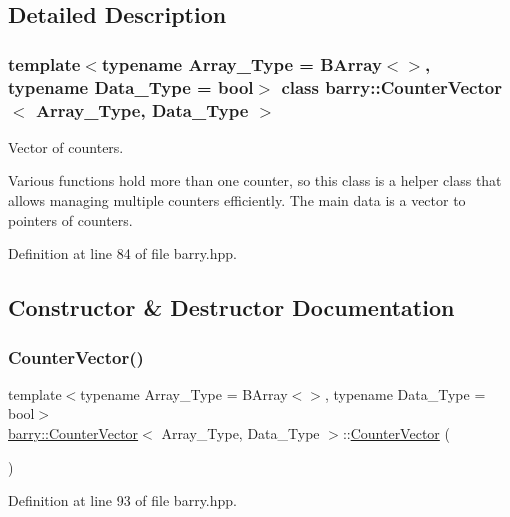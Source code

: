 \subsection{Detailed Description}
\subsubsection*{template$<$typename Array\+\_\+\+Type = B\+Array$<$$>$, typename Data\+\_\+\+Type = bool$>$\newline
class barry\+::\+Counter\+Vector$<$ Array\+\_\+\+Type, Data\+\_\+\+Type $>$}

Vector of counters. 

Various functions hold more than one counter, so this class is a helper class that allows managing multiple counters efficiently. The main data is a vector to pointers of counters. 

Definition at line 84 of file barry.\+hpp.



\subsection{Constructor \& Destructor Documentation}
\mbox{\label{classbarry_1_1_counter_vector_a620e7a96ebfd05fe71da6476f27c2850}} 
\subsubsection{\texorpdfstring{Counter\+Vector()}{CounterVector()}}
{\footnotesize\ttfamily template$<$typename Array\+\_\+\+Type = B\+Array$<$$>$, typename Data\+\_\+\+Type = bool$>$ \\
\hyperlink{classbarry_1_1_counter_vector}{barry\+::\+Counter\+Vector}$<$ Array\+\_\+\+Type, Data\+\_\+\+Type $>$\+::\hyperlink{classbarry_1_1_counter_vector}{Counter\+Vector} (\begin{DoxyParamCaption}{ }\end{DoxyParamCaption})\hspace{0.3cm}{\ttfamily [inline]}}



Definition at line 93 of file barry.\+hpp.

\mbox{\label{classbarry_1_1_counter_vector_a6a6cfc7b9a3ff220311d312786a8e3eb}} 
